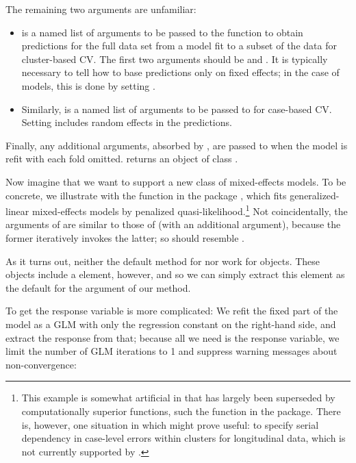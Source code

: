 \documentclass[
]{jss}
\begin{document}
The remaining two arguments are unfamiliar:

\begin{itemize}
\item
   is a named list of arguments to be passed
  to the  function to obtain predictions for the full
  data set from a model fit to a subset of the data for cluster-based
  CV. The first two arguments should be  and
  . It is typically necessary to tell  how
  to base predictions only on fixed effects; in the case of 
  models, this is done by setting .
\item
  Similarly,  is a named list of arguments to
  be passed to  for case-based CV. Setting
   includes random effects in the predictions.
\end{itemize}

Finally, any additional arguments, absorbed by , are passed to
 when the model is refit with each fold omitted.
 returns an object of class .

Now imagine that we want to support a new class of mixed-effects models.
To be concrete, we illustrate with the  function in the
 package \citep{VenablesRipley:2002}, which fits
generalized-linear mixed-effects models by penalized
quasi-likelihood.\footnote{This example is somewhat artificial in that
   has largely been superseded by computationally
  superior functions, such the  function in the 
  package. There is, however, one situation in which 
  might prove useful: to specify serial dependency in case-level errors
  within clusters for longitudinal data, which is not currently
  supported by .} Not coincidentally, the arguments of
 are similar to those of  (with an
additional  argument), because the former iteratively
invokes the latter; so  should resemble
.

As it turns out, neither the default method for  nor
 work for  objects. These
objects include a  element, however, and so we can simply
extract this element as the default for the  argument of our
 method.

To get the response variable is more complicated: We refit the fixed
part of the model as a GLM with only the regression constant on the
right-hand side, and extract the response from that; because all we need
is the response variable, we limit the number of GLM iterations to 1 and
suppress warning messages about non-convergence:
\end{document}
